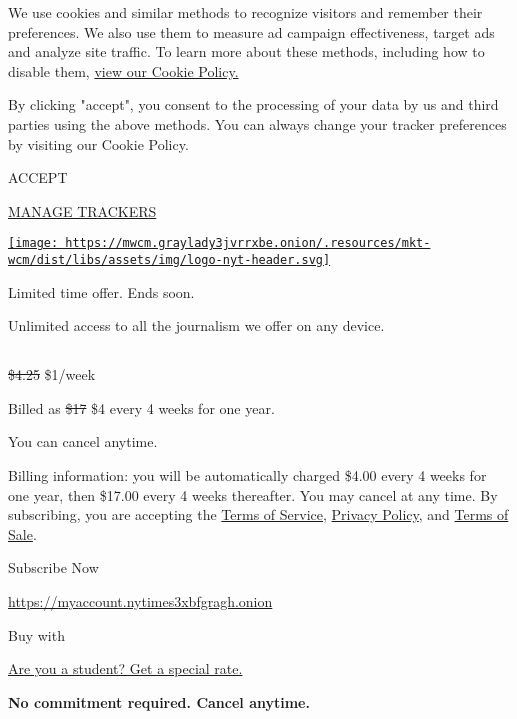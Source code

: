 We use cookies and similar methods to recognize visitors and remember
their preferences. We also use them to measure ad campaign
effectiveness, target ads and analyze site traffic. To learn more about
these methods, including how to disable them,
\href{https://nytimes3xbfgragh.onion/cookie-policy}{view our Cookie
Policy.}

By clicking "accept", you consent to the processing of your data by us
and third parties using the above methods. You can always change your
tracker preferences by visiting our Cookie Policy.

ACCEPT

\href{https://nytimes3xbfgragh.onion/cookie-policy}{MANAGE TRACKERS}

\href{https://www.nytimes3xbfgragh.onion/}{\texttt{[image: https://mwcm.graylady3jvrrxbe.onion/.resources/mkt-wcm/dist/libs/assets/img/logo-nyt-header.svg]}}

Limited time offer. Ends soon.

Unlimited access to all the journalism we offer on any device.

\subsection{}

\sout{\$4.25} \$1/week

Billed as \sout{\$17} \$4 every 4 weeks for one year.

You can cancel anytime.

Billing information: you will be automatically charged \$4.00 every 4
weeks for one year, then \$17.00 every 4 weeks thereafter. You may
cancel at any time. By subscribing, you are accepting the
\href{https://www.nytimes3xbfgragh.onion/content/help/rights/terms/terms-of-service.html}{Terms
of Service},
\href{https://www.nytimes3xbfgragh.onion/content/help/rights/privacy/policy/privacy-policy.html}{Privacy
Policy}, and
\href{https://www.nytimes3xbfgragh.onion/content/help/rights/sale/terms-of-sale.html}{Terms
of Sale}.

\href{https://myaccount.nytimes3xbfgragh.onion/get-started?OC=20000216880\&campaignId=37WXW}{}

Subscribe Now

\url{https://myaccount.nytimes3xbfgragh.onion}

Buy with

\href{/subscription/education?campaignId=6JQ7F}{Are you a student? Get a
special rate. }

\textbf{No commitment required. Cancel anytime.}

